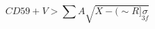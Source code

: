 \documentclass[11pt,a4paper]{article}
\begin{document}
\[
C D 5 9 + V > \sum A \sqrt{X - ( \sim R ] \underset{3 f }{\sigma }}
\]
\end{document}
